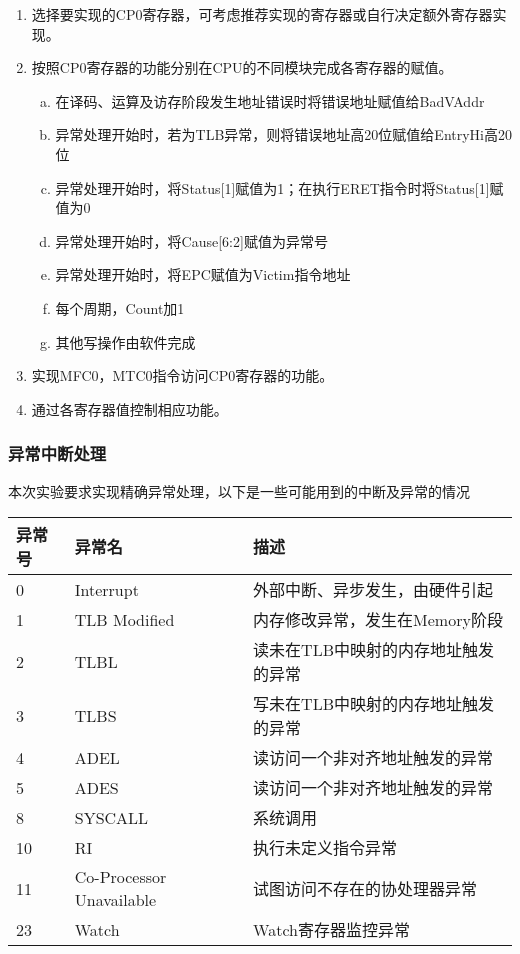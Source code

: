 \begin{enumerate}[(1)]
\item 选择要实现的CP0寄存器，可考虑推荐实现的寄存器或自行决定额外寄存器实现。

\item 按照CP0寄存器的功能分别在CPU的不同模块完成各寄存器的赋值。

\begin{enumerate}[(a)]
\item 在译码、运算及访存阶段发生地址错误时将错误地址赋值给BadVAddr

\item 异常处理开始时，若为TLB异常，则将错误地址高20位赋值给EntryHi高20位

\item 异常处理开始时，将Status[1]赋值为1；在执行ERET指令时将Status[1]赋值为0

\item 异常处理开始时，将Cause[6:2]赋值为异常号

\item 异常处理开始时，将EPC赋值为Victim指令地址

\item 每个周期，Count加1

\item 其他写操作由软件完成 
\end{enumerate}

\item 实现MFC0，MTC0指令访问CP0寄存器的功能。

\item 通过各寄存器值控制相应功能。

\end{enumerate}


\subsubsection{异常中断处理}
本次实验要求实现精确异常处理，以下是一些可能用到的中断及异常的情况

\begin{table}[H]
\centering
\begin{tabular}{lll}
\hline
异常号&异常名&描述\\
\hline
0&Interrupt&外部中断、异步发生，由硬件引起\\
1&TLB Modified&内存修改异常，发生在Memory阶段\\
2&TLBL&读未在TLB中映射的内存地址触发的异常\\
3&TLBS&写未在TLB中映射的内存地址触发的异常\\
4&ADEL&读访问一个非对齐地址触发的异常\\
5&ADES&读访问一个非对齐地址触发的异常\\
8&SYSCALL&系统调用\\
10&RI&执行未定义指令异常\\
11&Co-Processor Unavailable&试图访问不存在的协处理器异常\\
23&Watch&Watch寄存器监控异常\\
\hline
\end{tabular}
\end{table}

